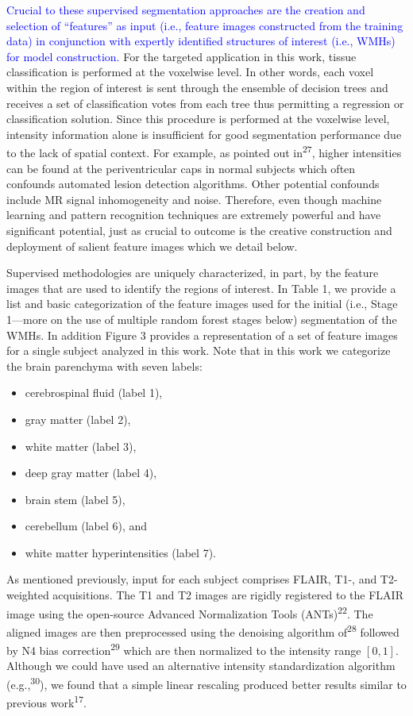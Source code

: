 \documentclass[11pt,]{article}
\providecommand{\tightlist}{%
  \setlength{\itemsep}{0pt}\setlength{\parskip}{0pt}}
\begin{document}
\textcolor{blue}{
Crucial to these supervised segmentation approaches are the creation and selection of
``features'' as input (i.e., feature images constructed from the training data)
in conjunction with expertly identified structures of interest
(i.e., WMHs) for model construction.} For the targeted application in
this work, tissue classification is performed at the voxelwise level. In
other words, each voxel within the region of interest is sent through
the ensemble of decision trees and receives a set of classification
votes from each tree thus permitting a regression or classification
solution. Since this procedure is performed at the voxelwise level,
intensity information alone is insufficient for good segmentation
performance due to the lack of spatial context. For example, as pointed
out in\textsuperscript{27}, higher intensities can be found at the
periventricular caps in normal subjects which often confounds automated
lesion detection algorithms. Other potential confounds include MR signal
inhomogeneity and noise. Therefore, even though machine learning and
pattern recognition techniques are extremely powerful and have
significant potential, just as crucial to outcome is the creative
construction and deployment of salient feature images which we detail
below.

Supervised methodologies are uniquely characterized, in part, by the
feature images that are used to identify the regions of interest. In
Table 1, we provide a list and basic categorization of the feature
images used for the initial (i.e., Stage 1---more on the use of multiple
random forest stages below) segmentation of the WMHs. In addition Figure
3 provides a representation of a set of feature images for a single
subject analyzed in this work. Note that in this work we categorize the
brain parenchyma with seven labels:

\begin{itemize}
\tightlist
\item
  cerebrospinal fluid (label 1),
\item
  gray matter (label 2),
\item
  white matter (label 3),
\item
  deep gray matter (label 4),
\item
  brain stem (label 5),
\item
  cerebellum (label 6), and
\item
  white matter hyperintensities (label 7).
\end{itemize}

As mentioned previously, input for each subject comprises FLAIR, T1-,
and T2-weighted acquisitions. The T1 and T2 images are rigidly
registered to the FLAIR image using the open-source Advanced
Normalization Tools (ANTs)\textsuperscript{22}. The aligned images are
then preprocessed using the denoising algorithm of\textsuperscript{28}
followed by N4 bias correction\textsuperscript{29} which are then
normalized to the intensity range \([0,1]\). Although we could have used
an alternative intensity standardization algorithm
(e.g.,\textsuperscript{30}), we found that a simple linear rescaling
produced better results similar to previous work\textsuperscript{17}.
\end{document}
